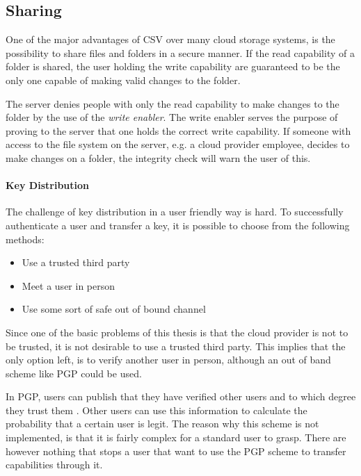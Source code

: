 \documentclass[pdftex,english,10pt,b5paper,twoside]{book}
\begin{document}
\subsection{Sharing}

One of the major advantages of \ac{CSV} over many cloud storage systems, is the
possibility to share files and folders in a secure manner. If the read
capability of a folder is shared, the user holding the write capability are
guaranteed to be the only one capable of making valid changes to the folder.

The server denies people with only the read capability to make changes to the
folder by the use of the \emph{write enabler}. The write enabler serves the
purpose of proving to the server that one holds the correct write capability.
If someone with access to the file system on the server, e.g. a cloud
provider employee, decides to make changes on a folder, the integrity check
will warn the user of this.

\paragraph{Key Distribution}
\label{sec:DI:keydist}

The challenge of key distribution in a user friendly way is hard. To
successfully authenticate a user and transfer a key, it is possible to choose
from the following methods:

\begin{itemize}
 \item Use a trusted third party
 \item Meet a user in person
 \item Use some sort of safe out of bound channel
\end{itemize}

Since one of the basic problems of this thesis is that the cloud provider is
not to be trusted, it is not desirable to use a trusted third party. This
implies that the only option left, is to verify another user in person,
although an out of band scheme like \ac{PGP} could be used. 

In \ac{PGP}, users can publish that they have verified other users and to which
degree they trust them \cite{stallings}. Other users can use this information
to calculate the probability that a certain user is legit. The reason why this
scheme is not implemented, is that it is fairly complex for a standard user to
grasp. There are however nothing that stops a user that want to use the
\ac{PGP} scheme to transfer capabilities through it.
\end{document}
